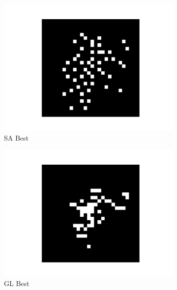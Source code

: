 \documentclass[a4paper,twocolumn]{article} %
\begin{document}
\begin{figure}[h!]
    \begin{subfigure}[t]{0.19\linewidth}
        \includegraphics[width=\linewidth]{figures/best_seed_sa.pdf}
        \caption*{SA Best}
    \end{subfigure}
    \hfill
    \begin{subfigure}[t]{0.19\linewidth}
        \includegraphics[width=\linewidth]{figures/best_seed_gl.pdf}
        \caption*{GL Best}
    \end{subfigure}
    \hfill
    \begin{subfigure}[t]{0.19\linewidth}

\end{subfigure}
\end{figure}
\end{document}
